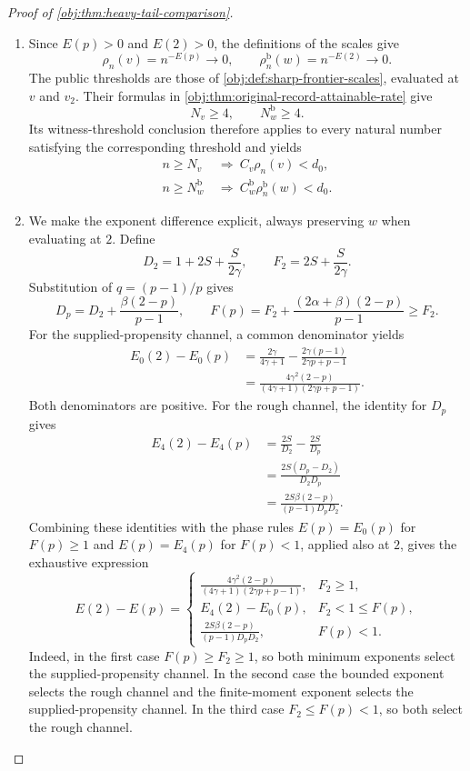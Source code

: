 \begin{proof}[Proof of \cref{obj:thm:heavy-tail-comparison}]
\begin{enumerate}
\item Since \(E(p)>0\) and \(E(2)>0\), the definitions of the scales give
\[
\rho_n(v)=n^{-E(p)}\longrightarrow0,
\qquad
\rho_n^{\mathrm b}(w)=n^{-E(2)}\longrightarrow0.
\]
The public thresholds are those of \cref{obj:def:sharp-frontier-scales}, evaluated at \(v\) and \(v_2\). Their formulas in \cref{obj:thm:original-record-attainable-rate} give
\[
N_v\ge4,\qquad N_w^{\mathrm b}\ge4.
\]
Its witness-threshold conclusion therefore applies to every natural number satisfying the corresponding threshold and yields
\[
\begin{aligned}
n\ge N_v&\ \Longrightarrow\ C_v\rho_n(v)<d_0,\\
n\ge N_w^{\mathrm b}&\ \Longrightarrow\
C_w^{\mathrm b}\rho_n^{\mathrm b}(w)<d_0.
\end{aligned}
\]

\item We make the exponent difference explicit, always preserving \(w\) when evaluating at \(2\). Define
\[
D_2=1+2S+\frac{S}{2\gamma},
\qquad
F_2=2S+\frac{S}{2\gamma}.
\]
Substitution of \(q=(p-1)/p\) gives
\[
D_p=D_2+\frac{\beta(2-p)}{p-1},
\qquad
F(p)=F_2+\frac{(2\alpha+\beta)(2-p)}{p-1}
\ge F_2.
\]
For the supplied-propensity channel, a common denominator yields
\[
\begin{aligned}
E_0(2)-E_0(p)
&=\frac{2\gamma}{4\gamma+1}
 -\frac{2\gamma(p-1)}{2\gamma p+p-1}\\
&=\frac{4\gamma^2(2-p)}
 {(4\gamma+1)(2\gamma p+p-1)}.
\end{aligned}
\]
Both denominators are positive. For the rough channel, the identity for \(D_p\) gives
\[
\begin{aligned}
E_4(2)-E_4(p)
&=\frac{2S}{D_2}-\frac{2S}{D_p}\\
&=\frac{2S(D_p-D_2)}{D_2D_p}\\
&=\frac{2S\beta(2-p)}{(p-1)D_pD_2}.
\end{aligned}
\]
Combining these identities with the phase rules \(E(p)=E_0(p)\) for \(F(p)\ge1\) and \(E(p)=E_4(p)\) for \(F(p)<1\), applied also at \(2\), gives the exhaustive expression
\[
E(2)-E(p)=
\begin{cases}
\displaystyle
\frac{4\gamma^2(2-p)}
 {(4\gamma+1)(2\gamma p+p-1)},
&F_2\ge1,\\[6pt]
\displaystyle
E_4(2)-E_0(p),
&F_2<1\le F(p),\\[4pt]
\displaystyle
\frac{2S\beta(2-p)}{(p-1)D_pD_2},
&F(p)<1.
\end{cases}
\]
Indeed, in the first case \(F(p)\ge F_2\ge1\), so both minimum exponents select the supplied-propensity channel. In the second case the bounded exponent selects the rough channel and the finite-moment exponent selects the supplied-propensity channel. In the third case \(F_2\le F(p)<1\), so both select the rough channel.


\end{enumerate}
\end{proof}

